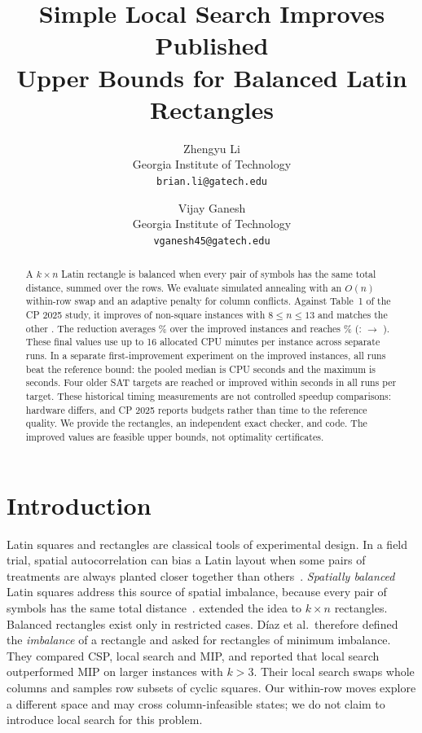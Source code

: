 \documentclass[11pt]{article}
\title{Simple Local Search Improves \NumImproved{} Published\\Upper Bounds for Balanced Latin Rectangles}
\author{Zhengyu Li\\ Georgia Institute of Technology\\ \texttt{brian.li@gatech.edu}
  \and Vijay Ganesh\\ Georgia Institute of Technology\\ \texttt{vganesh45@gatech.edu}}
\date{}
\begin{document}
\maketitle

\begin{abstract}
A $k\times n$ Latin rectangle is balanced when every pair of symbols has the same total
distance, summed over the rows. We evaluate simulated annealing with an $O(n)$ within-row
swap and an adaptive penalty for column conflicts. Against Table~1 of the CP 2025 study,
it improves \NumImproved{} of \NumCells{} non-square instances with $8\le n\le13$ and
matches the other \NumMatched{}. The reduction averages \MeanGain\% over the improved
instances and reaches \MaxGain\% (\TopCell: \TopOld{} $\to$ \TopNew).
These final values use up to 16 allocated CPU minutes per instance across separate runs.
In a separate first-improvement experiment on the \NumImproved{} improved instances,
all \NumTimingRuns{} runs beat the reference bound: the pooled median is \MedianBeat{}
CPU seconds and the maximum is \MaxBeat{} seconds. Four older SAT targets are reached
or improved within \MaxMatch{} seconds in all \NumSeeds{} runs per target.
These historical timing measurements are not controlled speedup comparisons: hardware
differs, and CP 2025 reports budgets rather than time to the reference quality.
We provide the rectangles, an independent exact checker, and code. The improved values
are feasible upper bounds, not optimality certificates.

\end{abstract}

\section{Introduction}

Latin squares and rectangles are classical tools of experimental design. In a field trial,
spatial autocorrelation can bias a Latin layout when some pairs of treatments are always planted
closer together than others~\citep{vanEs1993}. \emph{Spatially balanced} Latin squares address this source of spatial imbalance, because every pair of symbols has the same total
distance~\citep{GomesSellmann2004,LeBrasGomesSelman2012}. \citet{DiazLeBrasGomes2017} extended
the idea to $k\times n$ rectangles. Balanced rectangles exist only in restricted cases. Díaz et
al.\ therefore defined the \emph{imbalance} of a rectangle and asked for rectangles of minimum
imbalance. They compared CSP, local search and MIP, and reported that local search outperformed MIP
on larger instances with $k>3$. Their local search swaps whole columns and samples row
subsets of cyclic squares. Our within-row moves explore a different space and may cross
column-infeasible states; we do not claim to introduce local search for this problem.
\end{document}
